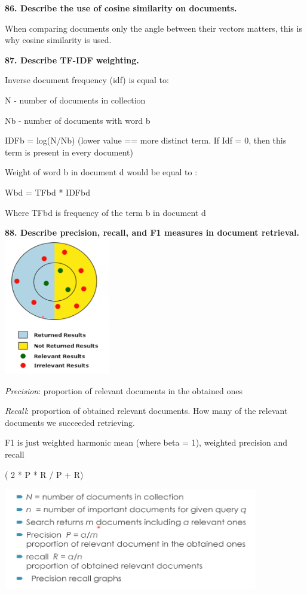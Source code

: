 \textbf{86. Describe the use of cosine similarity on documents.}

When comparing documents only the angle between their vectors matters,
this is why cosine similarity is used.

\textbf{87. Describe TF-IDF weighting.}

Inverse document frequency (idf) is equal to:

N - number of documents in collection

Nb - number of documents with word b

IDFb = log(N/Nb) (lower value == more distinct term. If Idf = 0, then
this term is present in every document)

Weight of word b in document d would be equal to :

Wbd = TFbd * IDFbd

Where TFbd is frequency of the term b in document d

\textbf{88. Describe precision, recall, and F1 measures in document
retrieval.}\includegraphics[width=1.81927in,height=2.35781in]{media/image23.png}

\textit{Precision}: proportion of relevant documents in the obtained
ones

\textit{Recall}: proportion of obtained relevant documents. How many
of the relevant documents we succeeded retrieving.

F1 is just weighted harmonic mean (where beta = 1), weighted precision
and recall

( 2 * P * R / P + R)

\includegraphics[width=4.39063in,height=1.74856in]{media/image15.png}

